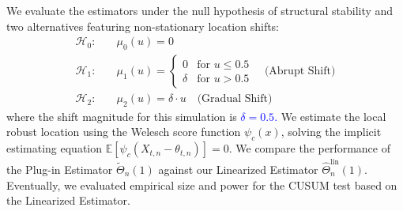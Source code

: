 \documentclass[10pt, a4paper]{article}
\theoremstyle{assumption}
\theoremstyle{definition}
\theoremstyle{theorem}
\begin{document}
We evaluate the estimators under the null hypothesis of structural stability and two alternatives featuring non-stationary location shifts:
\begin{align*}
    \mathcal{H}_0: \quad & \mu_0(u) = 0 \\
    \mathcal{H}_1: \quad & \mu_1(u) = 
    \begin{cases}
         0  & \text{for } u \le 0.5 \\
         \delta  & \text{for } u > 0.5 
    \end{cases} \quad \text{(Abrupt Shift)} \\
    \mathcal{H}_2: \quad & \mu_2(u) = \delta \cdot u \quad \text{(Gradual Shift)}
\end{align*}
where the shift magnitude for this simulation is \textcolor{blue}{$\delta = 0.5$.} We estimate the local robust location using the Welesch score function $\psi_c(x)$, solving the implicit estimating equation $\mathbb{E}[\psi_c(X_{t,n} - \theta_{t,n})] = 0$. We compare the performance of the Plug-in Estimator $\widetilde{\Theta}_n(1)$ against our  Linearized Estimator $\widehat{\Theta}_n^{\text{lin}}(1)$. Eventually, we evaluated empirical size and power for the CUSUM test based on the Linearized Estimator.
\end{document}
